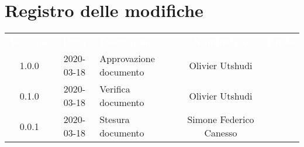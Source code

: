 \section*{Registro delle modifiche}
{
	\centering
	\begin{longtable}{ c c  C{4cm}  c  c }
		\textcolor{white}{\textbf{Versione}} & \textcolor{white}{\textbf{Data}} & \textcolor{white}{\textbf{Descrizione}} & \textcolor{white}{\textbf{Nominativo}} & \textcolor{white}{\textbf{Ruolo}}\\		
		1.0.0 & 2020-03-18 & Approvazione documento & Olivier Utshudi &\RdP{}\\		
		0.1.0 & 2020-03-18 & Verifica documento & Olivier Utshudi &\ver{}\\		
		0.0.1 & 2020-03-18 & Stesura documento & Simone Federico Canesso &\reda{}\\		
		
	\end{longtable}

}